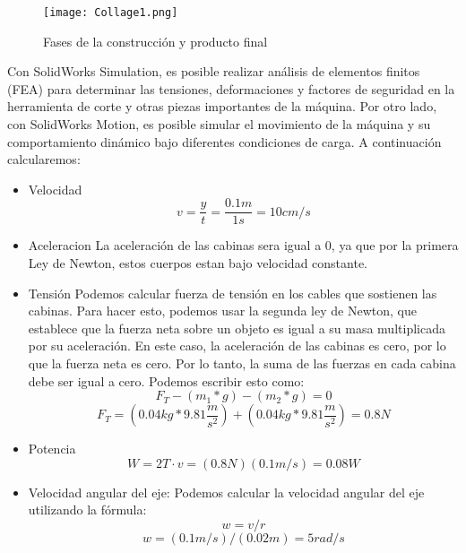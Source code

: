 \documentclass[letterpaper]{article}
\begin{document}
\begin{figure}[H]
	\centering
	\texttt{[image: Collage1.png]}
	\caption{Fases de la construcción y producto final}
	\label{fig:imagen2}
\end{figure}
\newpage
Con SolidWorks Simulation, es posible realizar análisis de elementos finitos (FEA) para determinar las tensiones, deformaciones y factores de seguridad en la herramienta de corte y otras piezas importantes de la máquina.
Por otro lado, con SolidWorks Motion, es posible simular el movimiento de la máquina y su comportamiento dinámico bajo diferentes condiciones de carga.
\newline
A continuación calcularemos:

\begin{itemize}
	\item Velocidad
	      \newline
	      $$v=\frac{y}{t}=\frac{0.1m}{1s}=10cm/s$$
	\item Aceleracion
	      \newline
	      La aceleración de las cabinas sera igual a 0, ya que por la primera Ley de Newton, estos cuerpos
	      estan bajo velocidad constante.
	\item Tensión
	      \newline
	      Podemos calcular fuerza de tensión en los cables que sostienen las cabinas. Para hacer esto, podemos usar la segunda ley de Newton, que establece que la fuerza neta sobre un objeto es igual a su masa multiplicada por su aceleración. En este caso, la aceleración de las cabinas es cero, por lo que la fuerza neta es cero. Por lo tanto, la suma de las fuerzas en cada cabina debe ser igual a cero. Podemos escribir esto como:
	      \newline
	      $$F_{T}-\left ( m_{1}*g \right )-\left ( m_{2}*g \right )=0$$
	      $$F_{T}=\left ( 0.04kg*9.81\frac{m}{{s}^2} \right )+\left ( 0.04kg*9.81\frac{m}{{s}^2} \right )=0.8N$$
	\item Potencia
	      $$W=2T\cdot v=\left ( 0.8N \right )\left ( 0.1m/s \right )=0.08W$$
	\item Velocidad angular del eje:
	      \newline
	      Podemos calcular la velocidad angular del eje utilizando la fórmula:
	      \newline
	      $$w = v/r$$
	      $$w =\left ( 0.1m/s \right )/\left ( 0.02m \right )=5 rad/s$$
\end{itemize}
\end{document}
